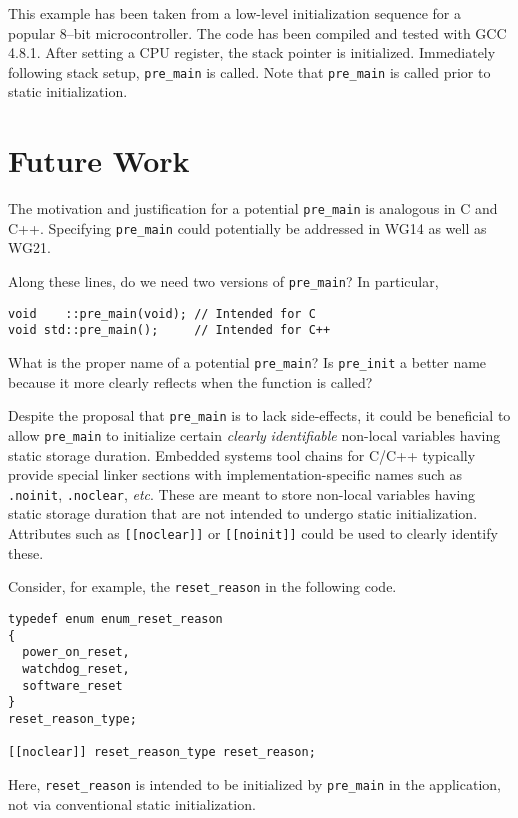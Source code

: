 \documentclass[11pt]{article}
\begin{document}
This example has been taken from a low-level initialization
sequence for a popular 8--bit microcontroller. The code has
been compiled and tested with GCC 4.8.1. After setting a
CPU register, the stack pointer is initialized.
Immediately following stack setup, \lstinline{pre_main} is called.
Note that \lstinline{pre_main} is called prior to
static initialization.

\section{Future Work}

The motivation and justification for a potential \lstinline{pre_main}
is analogous in C and C++. Specifying \lstinline{pre_main}
could potentially be addressed in WG14 as well as WG21.

Along these lines, do we need two versions of \lstinline{pre_main}?
In particular,

\begin{lstlisting}
void    ::pre_main(void); // Intended for C
void std::pre_main();     // Intended for C++
\end{lstlisting}

What is the proper name of a potential \lstinline{pre_main}?
Is \lstinline{pre_init} a better name because it
more clearly reflects when the function is called?

Despite the proposal that \lstinline{pre_main} is to lack side-effects,
it could be beneficial to allow \lstinline{pre_main} to initialize certain
\emph{clearly} \emph{identifiable} non-local variables
having static storage duration.
Embedded systems tool chains for C/C++ typically provide special
linker sections with implementation-specific names such as
\lstinline{.noinit}, \lstinline{.noclear}, \emph{etc}. These are meant
to store non-local variables having static storage duration that are not
intended to undergo static initialization.
Attributes such as \lstinline{[[noclear]]} or \lstinline{[[noinit]]}
could be used to clearly identify these.

Consider, for example, the \lstinline{reset_reason} in
the following code.

\begin{lstlisting}
typedef enum enum_reset_reason
{
  power_on_reset,
  watchdog_reset,
  software_reset
}
reset_reason_type;

[[noclear]] reset_reason_type reset_reason;
\end{lstlisting}

\noindent
Here, \lstinline{reset_reason} is intended to be initialized by
\lstinline{pre_main} in the application, not via conventional
static initialization.
\end{document}
